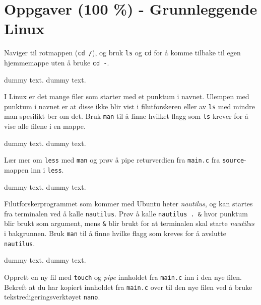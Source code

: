 \section{Oppgaver (100 \%) - Grunnleggende Linux}\label{sec:3-oppgave}


\begin{subprob}
    Naviger til rotmappen (\verb|cd /|), og bruk \verb|ls| og \verb|cd| for å komme tilbake til egen hjemmemappe uten å bruke \verb|cd -|.
	\begin{solution}
	    dummy text. dummy text. 
	\end{solution}
\end{subprob}

\begin{subprob}
    I Linux er det mange filer som starter med et punktum i navnet. Ulempen med punktum i navnet er at disse ikke blir vist i filutforskeren eller av \verb|ls| med mindre man spesifikt ber om det. Bruk \verb|man| til å finne hvilket flagg som \verb|ls| krever for å vise alle filene i en mappe. 
	\begin{solution}
	    dummy text. dummy text. 
	\end{solution}
\end{subprob}

\begin{subprob}   
    Lær mer om \verb|less| med \verb|man| og prøv å pipe returverdien fra \verb|main.c| fra \verb|source|-mappen inn i \verb|less|.
    
	\begin{solution}
	    dummy text. dummy text. 
	\end{solution}
\end{subprob}

\begin{subprob}
    Filutforskerprogrammet som kommer med Ubuntu heter \textit{nautilus}, og kan startes fra terminalen ved å kalle \verb|nautilus|. Prøv å kalle \verb|nautilus . &| hvor punktum blir brukt som argument, mens \verb|&| blir brukt for at terminalen skal starte \textit{nautilus} i bakgrunnen. Bruk \verb|man| til å finne hvilke flagg som kreves for å avslutte \verb|nautilus|.
    \begin{solution}
        dummy text. dummy text. 
	\end{solution}
\end{subprob}

\begin{subprob}
    Opprett en ny fil med \verb|touch| og \textit{pipe} innholdet fra \verb|main.c| inn i den nye filen. Bekreft at du har kopiert innholdet fra \verb|main.c| over til den nye filen ved å bruke tekstredigeringsverktøyet \verb|nano|.
\end{subprob}

